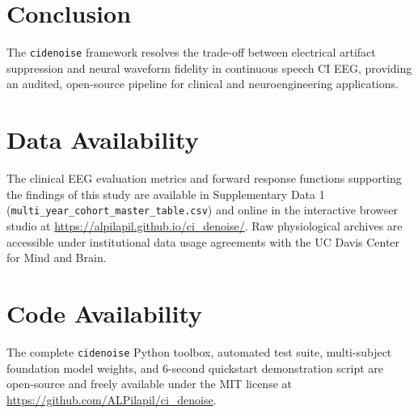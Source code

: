 \documentclass[11pt]{article}
\begin{document}
\section{Conclusion}
The \texttt{cidenoise} framework resolves the trade-off between electrical artifact suppression and neural waveform fidelity in continuous speech CI EEG, providing an audited, open-source pipeline for clinical and neuroengineering applications.

\section*{Data Availability}
The clinical EEG evaluation metrics and forward response functions supporting the findings of this study are available in Supplementary Data 1 (\texttt{multi\_year\_cohort\_master\_table.csv}) and online in the interactive browser studio at \url{https://alpilapil.github.io/ci_denoise/}. Raw physiological archives are accessible under institutional data usage agreements with the UC Davis Center for Mind and Brain.

\section*{Code Availability}
The complete \texttt{cidenoise} Python toolbox, automated test suite, multi-subject foundation model weights, and 6-second quickstart demonstration script are open-source and freely available under the MIT license at \url{https://github.com/ALPilapil/ci_denoise}.



\end{document}
